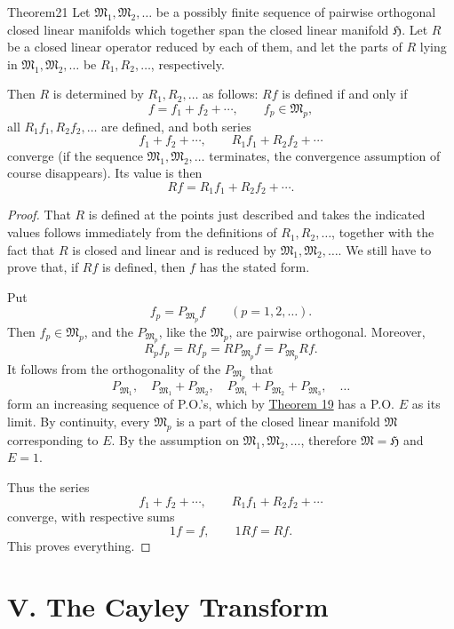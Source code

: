 ﻿\documentclass[paper=b5,fontsize=13pt,bookmarkpackage=false,twoside]{scrartcl}
\begin{document}
\begin{namedstatement}{Theorem}{21}\label{thm:21}
Let $\mathfrak M_1,\mathfrak M_2,\ldots$ be a possibly finite sequence of pairwise orthogonal closed linear manifolds which together span the closed linear manifold $\mathfrak H$. Let $R$ be a closed linear operator reduced by each of them, and let the parts of $R$ lying in $\mathfrak M_1,\mathfrak M_2,\ldots$ be $R_1,R_2,\ldots$, respectively.

Then $R$ is determined by $R_1,R_2,\ldots$ as follows: $Rf$ is defined if and only if
\[
f=f_1+f_2+\cdots,\qquad f_p\in\mathfrak M_p,
\]
all $R_1f_1,R_2f_2,\ldots$ are defined, and both series
\[
f_1+f_2+\cdots,\qquad R_1f_1+R_2f_2+\cdots
\]
converge (if the sequence $\mathfrak M_1,\mathfrak M_2,\ldots$ terminates, the convergence assumption of course disappears). Its value is then
\[
Rf=R_1f_1+R_2f_2+\cdots.
\]
\end{namedstatement}

\begin{proof}
That $R$ is defined at the points just described and takes the indicated values follows immediately from the definitions of $R_1,R_2,\ldots$, together with the fact that $R$ is closed and linear and is reduced by $\mathfrak M_1,\mathfrak M_2,\ldots$. We still have to prove that, if $Rf$ is defined, then $f$ has the stated form.

Put
\[
f_p=P_{\mathfrak M_p}f\qquad(p=1,2,\ldots).
\]
Then $f_p\in\mathfrak M_p$, and the $P_{\mathfrak M_p}$, like the $\mathfrak M_p$, are pairwise orthogonal. Moreover,
\[
R_pf_p=Rf_p=RP_{\mathfrak M_p}f=P_{\mathfrak M_p}Rf.
\]
It follows from the orthogonality of the $P_{\mathfrak M_p}$ that
\[
P_{\mathfrak M_1},\quad
P_{\mathfrak M_1}+P_{\mathfrak M_2},\quad
P_{\mathfrak M_1}+P_{\mathfrak M_2}+P_{\mathfrak M_3},\quad\ldots
\]
form an increasing sequence of P.O.'s, which by \hyperref[thm:19]{Theorem 19} has a P.O. $E$ as its limit. By continuity, every $\mathfrak M_p$ is a part of the closed linear manifold $\mathfrak M$ corresponding to $E$. By the assumption on $\mathfrak M_1,\mathfrak M_2,\ldots$, therefore $\mathfrak M=\mathfrak H$ and $E=1$.

Thus the series
\[
f_1+f_2+\cdots,\qquad R_1f_1+R_2f_2+\cdots
\]
converge, with respective sums
\[
1f=f,\qquad 1Rf=Rf.
\]
This proves everything.
\end{proof}

\section*{V. The Cayley Transform}\label{chap:V}
\end{document}

